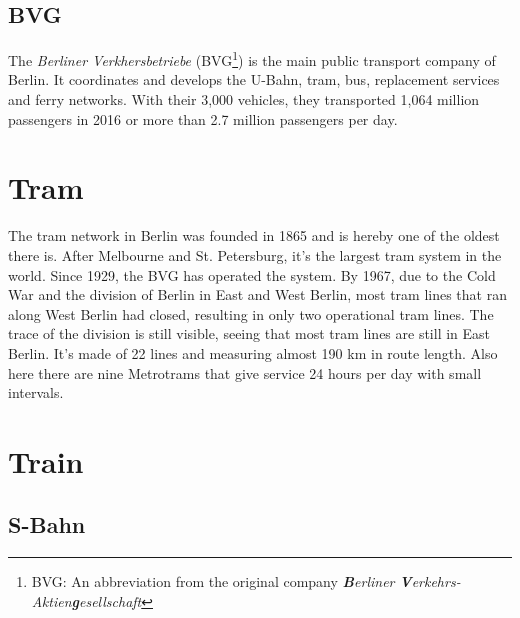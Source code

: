 \subsection*{BVG}
The \textit{Berliner Verkhersbetriebe} (BVG\footnote{BVG: An abbreviation from the original company \textit{\textbf{B}erliner \textbf{V}erkehrs-Aktien\textbf{g}esellschaft}}) is the main public transport company of Berlin. It coordinates and develops the U-Bahn, tram, bus, replacement services and ferry networks\cite{BVG1}. With their 3,000 vehicles, they transported 1,064 million passengers in 2016 or more than 2.7 million passengers per day\cite{MobilityCity}.


\section{Tram}
 The tram network in Berlin was founded in 1865 and is hereby one of the oldest there is. After Melbourne and St. Petersburg, it's the largest tram system in the world. Since 1929, the BVG has operated the system\cite{tram}. By 1967, due to the Cold War and the division of Berlin in East and West Berlin, most tram lines that ran along West Berlin had closed, resulting in only two operational tram lines. The trace of the division is still visible, seeing that most tram lines are still in East Berlin\cite{tramz}. It's made of 22 lines and measuring almost 190 km in route length. Also here there are nine Metrotrams that give service 24 hours per day with small intervals\cite{tram}. 
 
\section{Train}
\subsection{S-Bahn}

